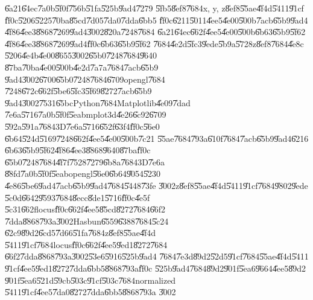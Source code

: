 \bigskip

\U{6a21}\U{64ec}\U{7a0b}\U{5f0f}\U{756b}\U{51fa}\U{525b}\U{9ad4}\U{7279}%
\U{5fb5}\U{8ef8}\U{7684}x, y, z\U{8ef8}\U{55ae}\U{4f4d}\U{5411}\U{91cf}%
\U{ff0c}\U{5206}\U{5225}\U{70ba}\U{85cd}\U{7d05}\U{7da0}\U{7dda}\U{6bb5}%
\U{ff0c}\U{6211}\U{5011}\U{4ee5}\U{4e00}\U{500b}\U{7acb}\U{65b9}\U{9ad4}%
\U{4f86}\U{4ee3}\U{8868}\U{7269}\U{9ad4}\U{3002}\U{820a}\U{7248}\U{7684}%
\U{6a21}\U{64ec}\U{662f}\U{4ee5}\U{4e00}\U{500b}\U{6b63}\U{65b9}\U{5f62}%
\U{4f86}\U{4ee3}\U{8868}\U{7269}\U{9ad4}\U{ff0c}\U{6b63}\U{65b9}\U{5f62}%
\U{7684}\U{4e2d}\U{5fc3}\U{9ede}\U{5b9a}\U{5728}z\U{8ef8}\U{7684}\U{4e8c}%
\U{5206}\U{4e4b}\U{4e00}\U{8655}\U{3002}\U{65b0}\U{7248}\U{7684}\U{9640}%
\U{87ba}\U{70ba}\U{4e00}\U{500b}\U{4e2d}\U{7a7a}\U{7684}\U{7acb}\U{65b9}%
\U{9ad4}\U{3002}\U{6700}\U{65b0}\U{7248}\U{7684}\U{6709}opengl\U{7684}%
\U{7248}\U{672c}\U{662f}\U{5be6}\U{5fc3}\U{5f69}\U{8272}\U{7acb}\U{65b9}%
\U{9ad4}\U{3002}\U{7531}\U{65bc}Python\U{7684}Matplotlib\U{4e09}\U{7dad}%
\U{7e6a}\U{5716}\U{7a0b}\U{5f0f}\U{5eab}mplot3d\U{4e26}\U{6c92}\U{6709}%
\U{592a}\U{591a}\U{7684}3D\U{7e6a}\U{5716}\U{652f}\U{63f4}\U{ff0c}\U{56e0}%
\U{6b64}\U{524d}\U{5169}\U{7248}\U{662f}\U{4ee5}\U{4e00}\U{500b}\U{7c21}%
\U{55ae}\U{7684}\U{793a}\U{610f}\U{7684}\U{7acb}\U{65b9}\U{9ad4}\U{6216}%
\U{6b63}\U{65b9}\U{5f62}\U{4f86}\U{4ee3}\U{8868}\U{9640}\U{87ba}\U{ff0c}%
\U{65b0}\U{7248}\U{7684}\U{4f7f}\U{7528}\U{7279}\U{6b8a}\U{7684}3D\U{7e6a}%
\U{88fd}\U{7a0b}\U{5f0f}\U{5eab}opengl\U{56e0}\U{6b64}\U{9054}\U{5230}%
\U{4e86}\U{5be6}\U{9ad4}\U{7acb}\U{65b9}\U{9ad4}\U{7684}\U{5448}\U{73fe}%
\U{3002}z\U{8ef8}\U{55ae}\U{4f4d}\U{5411}\U{91cf}\U{7684}\U{9802}\U{9ede}%
\U{5c0d}\U{6642}\U{9593}\U{7684}\U{8ecc}\U{8de1}\U{5716}\U{ff0c}\U{4e5f}%
\U{5c31}\U{662f}locus\U{ff0c}\U{662f}\U{4ee5}\U{85cd}\U{8272}\U{7684}\U{66f2}%
\U{7dda}\U{8868}\U{793a}\U{3002}Hasbun\U{6559}\U{6388}\U{7684}\U{5c24}%
\U{62c9}\U{89d2}\U{6cd5}\U{7d66}\U{51fa}\U{7684}z\U{8ef8}\U{55ae}\U{4f4d}%
\U{5411}\U{91cf}\U{7684}locus\U{ff0c}\U{662f}\U{4ee5}\U{9ed1}\U{8272}\U{7684}%
\U{66f2}\U{7dda}\U{8868}\U{793a}\U{3002}\U{53e6}\U{5916}\U{525b}\U{9ad4}%
\U{7684}\U{7e3d}\U{89d2}\U{52d5}\U{91cf}\U{7684}\U{55ae}\U{4f4d}\U{5411}%
\U{91cf}\U{4ee5}\U{9ed1}\U{8272}\U{7dda}\U{6bb5}\U{8868}\U{793a}\U{ff0c}%
\U{525b}\U{9ad4}\U{7684}\U{89d2}\U{901f}\U{5ea6}\U{9664}\U{4ee5}\U{89d2}%
\U{901f}\U{5ea6}\U{521d}\U{59cb}\U{503c}\U{91cf}\U{503c}\U{7684}normalized%
\U{5411}\U{91cf}\U{4ee5}\U{7da0}\U{8272}\U{7dda}\U{6bb5}\U{8868}\U{793a}%
\U{3002}

